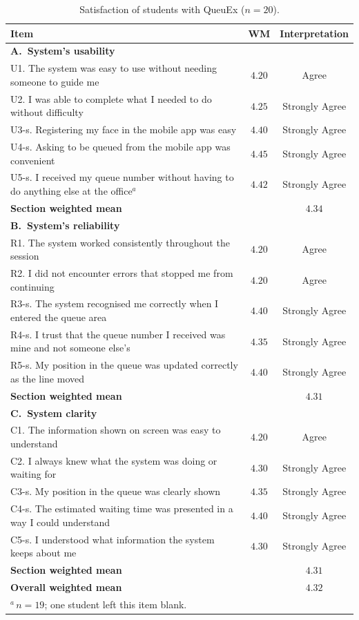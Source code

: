 \documentclass{research}
\newcommand{\sysname}{QueuEx}
\begin{document}
\begin{table}[!htbp]
\centering
\caption{Satisfaction of students with \sysname{} ($n = 20$).}
\label{tab:sop4-students}
\begin{tabular}{p{}cc}
\hline
Item & WM & Interpretation \\
\hline
\multicolumn{3}{l}{\textbf{A.\ System's usability}} \\
U1. The system was easy to use without needing someone to guide me
  & $4.20$ & Agree \\
U2. I was able to complete what I needed to do without difficulty
  & $4.25$ & Strongly Agree \\
U3-s. Registering my face in the mobile app was easy
  & $4.40$ & Strongly Agree \\
U4-s. Asking to be queued from the mobile app was convenient
  & $4.45$ & Strongly Agree \\
U5-s. I received my queue number without having to do anything else at
  the office$^{a}$ & $4.42$ & Strongly Agree \\
\hline
\multicolumn{2}{l}{\textbf{Section weighted mean}} & $4.34$ \\
\hline
\multicolumn{3}{l}{\textbf{B.\ System's reliability}} \\
R1. The system worked consistently throughout the session
  & $4.20$ & Agree \\
R2. I did not encounter errors that stopped me from continuing
  & $4.20$ & Agree \\
R3-s. The system recognised me correctly when I entered the queue area
  & $4.40$ & Strongly Agree \\
R4-s. I trust that the queue number I received was mine and not
  someone else's & $4.35$ & Strongly Agree \\
R5-s. My position in the queue was updated correctly as the line moved
  & $4.40$ & Strongly Agree \\
\hline
\multicolumn{2}{l}{\textbf{Section weighted mean}} & $4.31$ \\
\hline
\multicolumn{3}{l}{\textbf{C.\ System clarity}} \\
C1. The information shown on screen was easy to understand
  & $4.20$ & Agree \\
C2. I always knew what the system was doing or waiting for
  & $4.30$ & Strongly Agree \\
C3-s. My position in the queue was clearly shown
  & $4.35$ & Strongly Agree \\
C4-s. The estimated waiting time was presented in a way I could
  understand & $4.40$ & Strongly Agree \\
C5-s. I understood what information the system keeps about me
  & $4.30$ & Strongly Agree \\
\hline
\multicolumn{2}{l}{\textbf{Section weighted mean}} & $4.31$ \\
\hline
\multicolumn{2}{l}{\textbf{Overall weighted mean}} & $\mathbf{4.32}$ \\
\hline
\multicolumn{3}{l}{\footnotesize $^{a}$\,$n = 19$; one student left this
item blank.} \\
\end{tabular}
\end{table}
\end{document}
